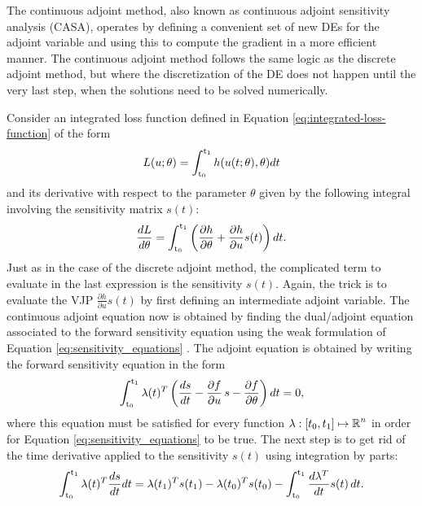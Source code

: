 The continuous adjoint method, also known as continuous adjoint sensitivity analysis (CASA), operates by defining a convenient set of new DEs for the adjoint variable and using this to compute the gradient in a more efficient manner. 
The continuous adjoint method follows the same logic as the discrete adjoint method, but where the discretization of the DE does not happen until the very last step, when the solutions need to be solved numerically. 

Consider an integrated loss function defined in Equation \eqref{eq:integrated-loss-function} of the form 
\begin{equation}
    L(u; \theta) = \operatorname{\int_{t_0}^{t_1}} h(u(t;\theta), \theta) dt
\end{equation}
and its derivative with respect to the parameter $\theta$ given by the following integral involving the sensitivity matrix $s(t)$:
\begin{equation}
    \frac{dL}{d\theta}
    = 
    \operatorname{\int_{t_0}^{t_1}} \left( \frac{\partial h}{\partial \theta} + \frac{\partial h}{\partial u} s(t) \right) dt.
    \label{eq:casa-loss}
\end{equation}
Just as in the case of the discrete adjoint method, the complicated term to evaluate in the last expression is the sensitivity $s(t)$.
Again, the trick is to evaluate the VJP $\frac{\partial h}{\partial u} s(t)$ by first defining an intermediate adjoint variable. 
The continuous adjoint equation now is obtained by finding the dual/adjoint equation associated to the forward sensitivity equation using the weak formulation of Equation \eqref{eq:sensitivity_equations} \cite{brezis2011functional}. 
The adjoint equation is obtained by writing the forward sensitivity equation in the form 
\begin{equation}
    \operatorname{\int_{t_0}^{t_1}} \lambda(t)^T \left( \frac{ds}{dt} - \frac{\partial f}{\partial u} \, s - \frac{\partial f}{\partial \theta}  \right) dt 
    = 
    0,
    \label{eq:integrated-sensitivity-equation}
\end{equation}
where this equation must be satisfied for every function $\lambda: [t_0, t_1] \mapsto \operatorname{\mathbb{R}}^n$ in order for Equation \eqref{eq:sensitivity_equations} to be true. 
The next step is to get rid of the time derivative applied to the sensitivity $s(t)$ using integration by parts: 
\begin{equation}
    \operatorname{\int_{t_0}^{t_1}} \lambda(t)^T \frac{ds}{dt} dt
    = 
    \lambda(t_1)^T s(t_1) - \lambda(t_0)^T s(t_0)
    -
    \operatorname{\int_{t_0}^{t_1}} \frac{d\lambda^T}{dt} s(t)\, dt.
\end{equation}
